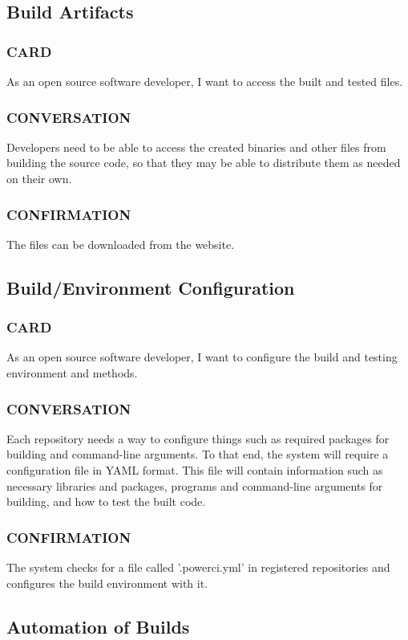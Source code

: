 \documentclass[10pt,letterpaper,onecolumn,journal]{IEEEtran}
\begin{document}
\subsection{Build Artifacts}
\subsubsection{CARD}
As an open source software developer, I want to access the built and tested files.
\subsubsection{CONVERSATION}
Developers need to be able to access the created binaries and other files from building the source code, so that they may
be able to distribute them as needed on their own.
\subsubsection{CONFIRMATION}
The files can be downloaded from the website.

\subsection{Build/Environment Configuration}
\subsubsection{CARD}
As an open source software developer, I want to configure the build and testing environment and methods.
\subsubsection{CONVERSATION}
Each repository needs a way to configure things such as required packages for building and command-line arguments.
To that end, the system will require a configuration file in YAML format. This file will contain information such as necessary
libraries and packages, programs and command-line arguments for building, and how to test the built code.
\subsubsection{CONFIRMATION}
The system checks for a file called '.powerci.yml' in registered repositories and configures the build environment with it.

\subsection{Automation of Builds}
\end{document}
